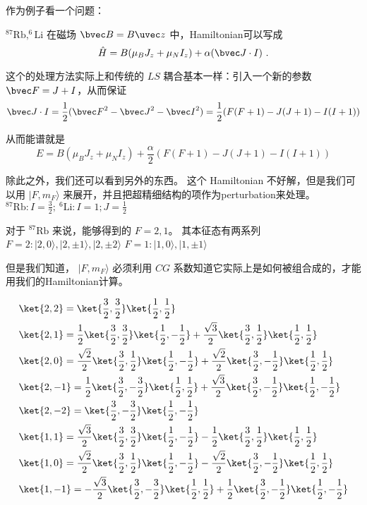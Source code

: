 作为例子看一个问题：

$^{87}{\text{Rb}}, ^6{\text{Li}}$ 在磁场 $\bvec B = B\uvec z$ 中，Hamiltonian可以写成
\begin{equation}
\hat{H} = B(\mu_B J_z+\mu_N I_z)+\alpha({\bvec J\cdot I})~.
\end{equation}

这个的处理方法实际上和传统的 $LS$ 耦合基本一样：引入一个新的参数 ${\bvec F = J+I}$，从而保证
\begin{equation}
{\bvec J\cdot I} = \frac{1}{2}({\bvec F}^2 - {\bvec J}^2 - {\bvec I}^2) = \frac{1}{2} (F(F+1) - J(J+1) - I(I+1))
\end{equation}

从而能谱就是
\begin{equation}
E = B(\mu_B J_z+\mu_N I_z)+\frac{\alpha}{2} (F(F+1) - J(J+1) - I(I+1))
\end{equation}

除此之外，我们还可以看到另外的东西。 这个 Hamiltonian 不好解，但是我们可以用 $|F,m_F\rangle$ 来展开，并且把超精细结构的项作为perturbation来处理。 $^{87}{\text{Rb}}: I = \frac{3}{2};\ ^6{\text{Li}}: I = 1; J = \frac{1}{2}$

对于 $^{87}{\text{Rb}}$ 来说，能够得到的 $F=2,1$。 其本征态有两系列
$F=2:|2,0\rangle,|2,\pm1\rangle,|2,\pm2\rangle$
$F=1:|1,0\rangle,|1,\pm1\rangle$

但是我们知道， $|F,m_F\rangle$ 必须利用 $CG$ 系数知道它实际上是如何被组合成的，才能用我们的Hamiltonian计算。

\begin{align}
&\ket{2,2} = \ket{\frac{3}{2},\frac{3}{2}} \ket{\frac{1}{2},\frac{1}{2}}\\
&\ket{2,1} = \frac{1}{2} \ket{\frac{3}{2},\frac{3}{2}} \ket{\frac{1}{2},-\frac{1}{2}} + \frac{\sqrt{3}}{2} \ket{\frac{3}{2},\frac{1}{2}} \ket{\frac{1}{2},\frac{1}{2}}\\
& \ket{2,0} = \frac{\sqrt{2}}{2} \ket{\frac{3}{2},\frac{1}{2}} \ket{\frac{1}{2},-\frac{1}{2}} + \frac{\sqrt{2}}{2} \ket{\frac{3}{2},-\frac{1}{2}} \ket{\frac{1}{2},\frac{1}{2}}\\
&\ket{2,-1} = \frac{1}{2} \ket{\frac{3}{2},-\frac{3}{2}} \ket{\frac{1}{2},\frac{1}{2}} + \frac{\sqrt{3}}{2} \ket{\frac{3}{2},-\frac{1}{2}} \ket{\frac{1}{2},-\frac{1}{2}}\\
& \ket{2,-2} = \ket{\frac{3}{2},-\frac{3}{2}} \ket{\frac{1}{2},-\frac{1}{2}}\\
&\ket{1,1} = \frac{\sqrt{3}}{2} \ket{\frac{3}{2},\frac{3}{2}} \ket{\frac{1}{2},-\frac{1}{2}} - \frac{1}{2} \ket{\frac{3}{2},\frac{1}{2}} \ket{\frac{1}{2},\frac{1}{2}}\\
&\ket{1,0} = \frac{\sqrt{2}}{2} \ket{\frac{3}{2},\frac{1}{2}} \ket{\frac{1}{2},-\frac{1}{2}} - \frac{\sqrt{2}}{2} \ket{\frac{3}{2},-\frac{1}{2}} \ket{\frac{1}{2},\frac{1}{2}}\\
&\ket{1,-1} = -\frac{\sqrt{3}}{2} \ket{\frac{3}{2},-\frac{3}{2}} \ket{\frac{1}{2},\frac{1}{2}} + \frac{1}{2} \ket{\frac{3}{2},-\frac{1}{2}} \ket{\frac{1}{2},-\frac{1}{2}}
\end{align}

